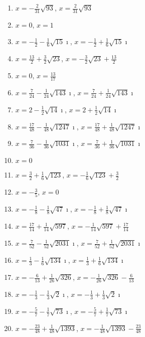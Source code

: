 \documentclass{article}
\begin{document}
    \begin{multicols}{2}
    \begin{enumerate}
    \item$x =- \frac{2}{31} \sqrt{93}$, $x =\frac{2}{31} \sqrt{93}$
\item$x =0$, $x =1$
\item$x =- \frac{1}{2} - \frac{1}{6} \sqrt{15} \mathbf{\imath}$, $x =- \frac{1}{2} + \frac{1}{6} \sqrt{15} \mathbf{\imath}$
\item$x =\frac{13}{2} + \frac{3}{2} \sqrt{23}$, $x =- \frac{3}{2} \sqrt{23} + \frac{13}{2}$
\item$x =0$, $x =\frac{13}{17}$
\item$x =\frac{7}{24} - \frac{1}{24} \sqrt{143} \mathbf{\imath}$, $x =\frac{7}{24} + \frac{1}{24} \sqrt{143} \mathbf{\imath}$
\item$x =2 - \frac{1}{2} \sqrt{14} \mathbf{\imath}$, $x =2 + \frac{1}{2} \sqrt{14} \mathbf{\imath}$
\item$x =\frac{17}{48} - \frac{1}{48} \sqrt{1247} \mathbf{\imath}$, $x =\frac{17}{48} + \frac{1}{48} \sqrt{1247} \mathbf{\imath}$
\item$x =\frac{7}{36} - \frac{1}{36} \sqrt{1031} \mathbf{\imath}$, $x =\frac{7}{36} + \frac{1}{36} \sqrt{1031} \mathbf{\imath}$
\item$x =0$
\item$x =\frac{3}{2} + \frac{1}{6} \sqrt{123}$, $x =- \frac{1}{6} \sqrt{123} + \frac{3}{2}$
\item$x =- \frac{3}{5}$, $x =0$
\item$x =- \frac{1}{8} - \frac{1}{8} \sqrt{47} \mathbf{\imath}$, $x =- \frac{1}{8} + \frac{1}{8} \sqrt{47} \mathbf{\imath}$
\item$x =\frac{17}{14} + \frac{1}{14} \sqrt{597}$, $x =- \frac{1}{14} \sqrt{597} + \frac{17}{14}$
\item$x =\frac{7}{52} - \frac{1}{52} \sqrt{2031} \mathbf{\imath}$, $x =\frac{7}{52} + \frac{1}{52} \sqrt{2031} \mathbf{\imath}$
\item$x =\frac{1}{3} - \frac{1}{6} \sqrt{134} \mathbf{\imath}$, $x =\frac{1}{3} + \frac{1}{6} \sqrt{134} \mathbf{\imath}$
\item$x =- \frac{6}{13} + \frac{1}{26} \sqrt{326}$, $x =- \frac{1}{26} \sqrt{326} - \frac{6}{13}$
\item$x =- \frac{1}{3} - \frac{1}{3} \sqrt{2} \mathbf{\imath}$, $x =- \frac{1}{3} + \frac{1}{3} \sqrt{2} \mathbf{\imath}$
\item$x =- \frac{5}{7} - \frac{1}{7} \sqrt{73} \mathbf{\imath}$, $x =- \frac{5}{7} + \frac{1}{7} \sqrt{73} \mathbf{\imath}$
\item$x =- \frac{23}{48} + \frac{1}{48} \sqrt{1393}$, $x =- \frac{1}{48} \sqrt{1393} - \frac{23}{48}$
    \end{enumerate}
    \end{multicols}
    

    
\end{document}
